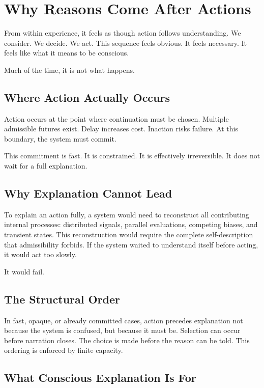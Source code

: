 \documentclass[11pt,twoside,openright]{book}
\begin{document}
\chapter{Why Reasons Come After Actions}
\label{ch:reasons_after_actions}

From within experience, it feels as though action follows understanding. We consider. We decide. We act. This sequence feels obvious. It feels necessary. It feels like what it means to be conscious.

Much of the time, it is not what happens.

\section*{Where Action Actually Occurs}

Action occurs at the point where continuation must be chosen. Multiple admissible futures exist. Delay increases cost. Inaction risks failure. At this boundary, the system must commit.

This commitment is fast. It is constrained. It is effectively irreversible. It does not wait for a full explanation.

\section*{Why Explanation Cannot Lead}

To explain an action fully, a system would need to reconstruct all contributing internal processes: distributed signals, parallel evaluations, competing biases, and transient states. This reconstruction would require the complete self-description that admissibility forbids. If the system waited to understand itself before acting, it would act too slowly.

It would fail.

\section*{The Structural Order}

In fast, opaque, or already committed cases, action precedes explanation not because the system is confused, but because it must be. Selection can occur before narration closes. The choice is made before the reason can be told. This ordering is enforced by finite capacity.

\section*{What Conscious Explanation Is For}
\end{document}
